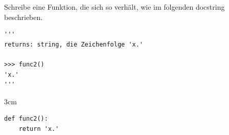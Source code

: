 
\question[1]
Schreibe eine Funktion, die sich so verhält, wie im folgenden docstring beschrieben.
 
\begin{lstlisting}
'''
returns: string, die Zeichenfolge 'x.'

>>> func2()
'x.'
'''

\end{lstlisting}

\begin{solutionbox}{3cm}
\begin{lstlisting}
def func2():
    return 'x.'
\end{lstlisting}
\end{solutionbox}
